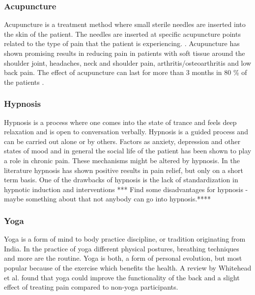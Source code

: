 \subsubsection{Acupuncture}
Acupuncture is a treatment method where small sterile needles are inserted into the skin of the patient. The needles are inserted at specific acupuncture points related to the type of pain that the patient is experiencing. \cite{Dhanani2011}. Acupuncture has shown promising results in reducing pain in patients with soft tissue around the shoulder joint, headaches, neck and shoulder pain, arthritis/osteoarthritis and low back pain. The effect of acupuncture can last for more than 3 months in 80 \% of the patients \cite{Junnilla1983}. 

\subsubsection{Hypnosis}
Hypnosis is a process where one comes into the state of trance and feels deep relaxation and is open to conversation verbally. Hypnosis is a guided process and can be carried out alone or by others. \cite{Gerald2013} Factors as anxiety, depression and other states of mood and in general the social life of the patient has been shown to play a role in chronic pain. These mechanisms might be altered by hypnosis.
In the literature hypnosis has shown positive results in pain relief, but only on a short term basis. \cite{Dhanani2011}
 One of the drawbacks of hypnosis is the lack of standardization in hypnotic induction and interventions \cite{Alkis2010}
*** Find some disadvantages for hypnosis - maybe something about that not anybody can go into hypnosis.****

\subsubsection{Yoga}
Yoga is a form of mind to body practice discipline, or tradition originating from India. In the practice of yoga different physical postures, breathing techniques and more are the routine. 
Yoga is both, a form of personal evolution, but most popular because of the exercise which benefits the health.
A review by Whitehead et al. \cite{Whitehead2017} found that yoga could improve the functionality of the back and a slight effect of treating pain compared to non-yoga participants. 

